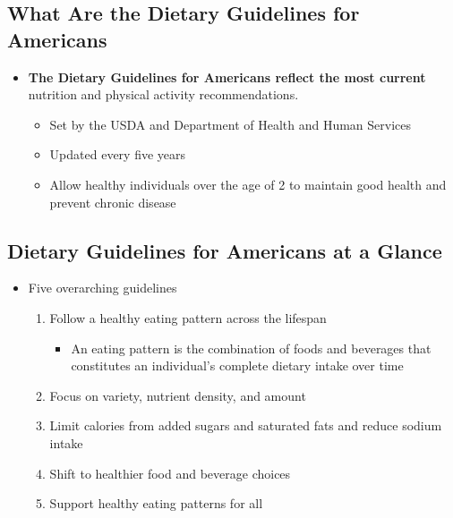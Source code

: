 \documentclass[12pt]{article}
\begin{document}
        \subsection{What Are the Dietary Guidelines for Americans}
            \begin{itemize}
                \item \textbf{The Dietary Guidelines for Americans reflect the most current} nutrition and physical activity recommendations.
                    \begin{itemize}
                        \item Set by the USDA and Department of Health and Human Services
                        \item Updated every five years
                        \item Allow healthy individuals over the age of 2 to maintain good health and prevent chronic disease
                    \end{itemize}
            \end{itemize}

        \subsection{Dietary Guidelines for Americans at a Glance}
            \begin{itemize}
                \item Five overarching guidelines
                    \begin{enumerate}
                        \item Follow a healthy eating pattern across the lifespan
                            \begin{itemize}
                                \item An eating pattern is the combination of foods and beverages that constitutes an individual's complete dietary intake over time
                            \end{itemize}
                        \item Focus on variety, nutrient density, and amount
                        \item Limit calories from added sugars and saturated fats and reduce sodium intake
                        \item Shift to healthier food and beverage choices
                        \item Support healthy eating patterns for all
                    \end{enumerate}
            \end{itemize}
\end{document}
